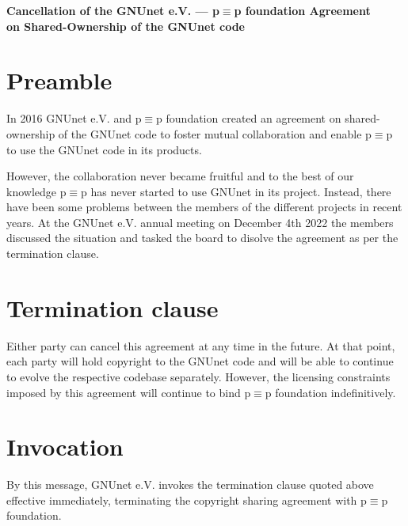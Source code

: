 \documentclass[10pt, a4paper, bibliography=totocnumbered]{article}
\begin{document}
\begin{center}
  \LARGE{\textbf{Cancellation of the GNUnet e.V. --- p$\equiv$p foundation Agreement\\
      on Shared-Ownership of the GNUnet code}}\\
\end{center}
\normalsize
\section*{Preamble}
In 2016 GNUnet e.V. and p$\equiv$p foundation created an agreement on
shared-ownership of the GNUnet code to foster mutual collaboration
and enable p$\equiv$p to use the GNUnet code in its products.

However, the collaboration never became fruitful and to the best of
our knowledge p$\equiv$p has never started to use GNUnet in its
project.  Instead, there have been some problems between the members
of the different projects in recent years. At the GNUnet e.V. annual
meeting on December 4th 2022 the members discussed the situation and
tasked the board to disolve the agreement as per the termination
clause.

\section*{Termination clause}

Either party can cancel this agreement at any time in the future.
At that point, each party will hold copyright to the GNUnet code
and will be able to continue to evolve the respective codebase
separately. However, the licensing constraints imposed by this
agreement will continue to bind p$\equiv$p foundation indefinitively.

\section*{Invocation}

By this message, GNUnet e.V. invokes the termination clause
quoted above effective immediately, terminating the copyright
sharing agreement with p$\equiv$p foundation.
\end{document}
